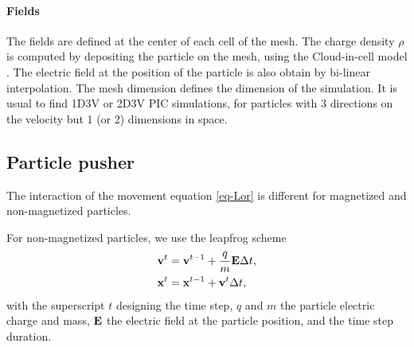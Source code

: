     \paragraph{Fields\\}
    The fields are defined at the center of each cell of the mesh.
    The charge density $\rho$ is computed by depositing the particle on the mesh, using the Cloud-in-cell model \cite{birdsall1991}.
    The electric field at the position of the particle is also obtain by bi-linear interpolation.
    The mesh dimension defines the dimension of the simulation.
    It is usual to find \acs{1D}\acs{3V} or \acs{2D}\acs{3V} \ac{PIC} simulations, for particles with 3 directions on the velocity but 1 (or 2) dimensions in space.

    \subsection{Particle pusher}
    The interaction of the movement equation \cref{eq-Lor} is different for magnetized and non-magnetized particles.

    For non-magnetized particles, we use the leapfrog scheme \cite{birdsall1991}
    \begin{align}\label{eq-leapfrog}
      {\mathbf v}^t &= {\mathbf v}^{t-1} + \frac{q}{m} {\mathbf E} \Delta t, \\
      {\mathbf x}^t &= {\mathbf x}^{t-1} + {\mathbf v}^t \Delta t,
    \end{align}
    with the superscript $t$ designing the time step, $q$ and $m$ the particle electric charge and mass, ${\mathbf E}$ the electric field at the particle position, and \dt the time step duration.

